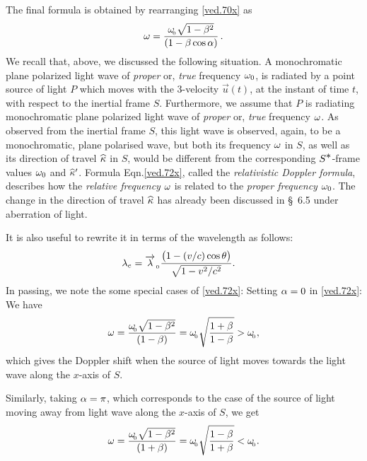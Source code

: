 The final formula is obtained by rearranging 
\eqref{ved.70x} 
as
\begin{align}\label{ved.72x}
{\omega}= \frac{{\omega}_{_{\hspace*{-1.5pt}{0}}}\sqrt{1-{\beta}^2}}
{(1 - {\beta}\cos{\alpha})}\,.
\end{align}
We recall that, above,  we discussed the following  
situation. A monochromatic plane polarized light wave of 
\textsl{proper} or, \textsl{true} frequency ${\omega}_0$, is 
radiated by a point source of light $P$ which moves with 
the 
3-velocity $\vec{u}(t)$, at the instant of time $t$, with 
respect to the inertial frame $S$. Furthermore, we assume 
that $P$ is radiating  monochromatic plane polarized 
light wave of \textsl{proper} or, \textsl{true} frequency 
${\omega}$. As observed from the inertial frame $S$, this light 
wave is observed, again, to be a  monochromatic, plane 
polarised wave, but both its  frequency ${\omega}$ in $S$, 
as well as its direction of travel ${\widehat{{\kappa}}}$ in $S$, 
would be different from the corresponding 
$S^{\textstyle \ast}$-frame  values ${\omega}_0$ and ${\widehat{{\kappa}}}'$.  
Formula Eqn.\eqref{ved.72x}, called the 
\textsl{relativistic 
Doppler formula}, describes how the \textsl{relative 
frequency} ${\omega}$ is related to  the \textsl{proper 
frequency} ${\omega}_0$. The change in the direction of travel 
${\widehat{{\kappa}}}$ has already been discussed in \S~6.5 under 
aberration of light.

It is also useful to rewrite it in terms of the wavelength 
as follows:
\begin{align} \label{ved.73x}
\lambda_e&=\overrightarrow{\lambda}_{_{\hspace*{-1.5pt}{\,\,0}}}\frac{
\big(1-(v/c)\cos\theta\big)}
{\sqrt{1-v^2/c^2}}.
\end{align}
In passing, we note the some special cases of  
\eqref{ved.72x}:
Setting ${\alpha} =0 $ in \eqref{ved.72x}: We have
\begin{align}\label{ved.74x}
{\omega}= \frac{{\omega}_{_{\hspace*{-1.5pt}{0}}}
\sqrt{1-{\beta}^2}} {(1 -{\beta})}= {\omega}_{_{\hspace*{-1.5pt}{0}}}
\sqrt{\frac{1+{\beta}}{1 -{\beta}}}> {\omega}_{_{\hspace*{-1.5pt}{0}}},
\end{align}
which gives the Doppler shift when {the source of light
moves towards the light wave} along the $x$-axis of 
$S$.

Similarly, taking ${\alpha} =\pi$, which corresponds to 
the 
case 
of the {source of light moving away from light wave} 
along 
the $x$-axis of $S$, we get
\begin{align}\label{ved.75x}
{\omega}= \frac{{\omega}_{_{\hspace*{-1.5pt}{0}}}\sqrt{1-{\beta}^2}}
{(1+{\beta})}= {\omega}_{_{\hspace*{-1.5pt}{0}}}\sqrt{\frac{1-{\beta}}
{1 +{\beta}}}<{\omega}_{_{\hspace*{-1.5pt}{0}}}.
\end{align}

